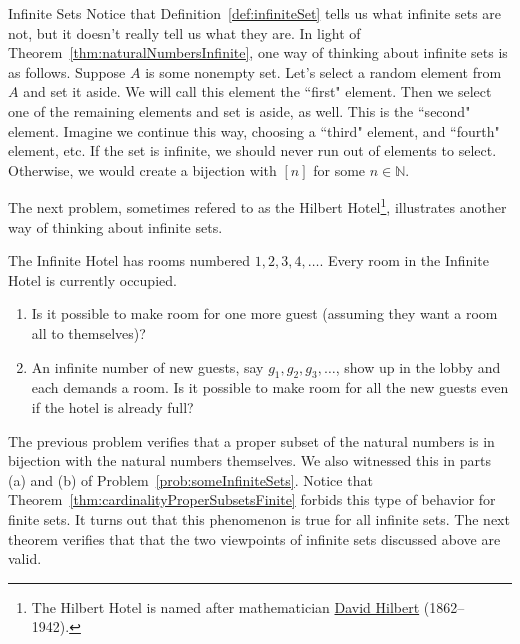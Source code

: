 \begin{section}{Infinite Sets}
Notice that Definition~\ref{def:infiniteSet} tells us what infinite sets are not, but it doesn't really tell us what they are. In light of Theorem~\ref{thm:naturalNumbersInfinite}, one way of thinking about infinite sets is as follows.  Suppose $A$ is some nonempty set. Let's select a random element from $A$ and set it aside. We will call this element the ``first" element.  Then we select one of the remaining elements and set is aside, as well.  This is the ``second" element.  Imagine we continue this way, choosing a ``third" element, and ``fourth" element, etc.  If the set is infinite, we should never run out of elements to select. Otherwise, we would create a bijection with $[n]$ for some $n\in\mathbb{N}$.

The next problem, sometimes refered to as the Hilbert Hotel\footnote{The Hilbert Hotel is named after mathematician \href{https://en.wikipedia.org/wiki/David_Hilbert}{David Hilbert} (1862--1942).}, illustrates another way of thinking about infinite sets.

\begin{problem}
The Infinite Hotel has rooms numbered $1,2,3,4,\ldots$. Every room in the Infinite Hotel is currently occupied.  
\begin{enumerate}[label=\textrm{(\roman*)}]
\item Is it possible to make room for one more guest (assuming they want a room all to themselves)? 
\item An infinite number of new guests, say $g_1, g_2,g_3,\ldots$, show up in the lobby and each demands a room.  Is it possible to make room for all the new guests even if the hotel is already full?
\end{enumerate}
\end{problem}

The previous problem verifies that a proper subset of the natural numbers is in bijection with the natural numbers themselves. We also witnessed this in parts (a) and (b) of Problem~\ref{prob:someInfiniteSets}. Notice that Theorem~\ref{thm:cardinalityProperSubsetsFinite} forbids this type of behavior for finite sets. It turns out that this phenomenon is true for all infinite sets. The next theorem verifies that that the two viewpoints of infinite sets discussed above are valid.


\end{section}
